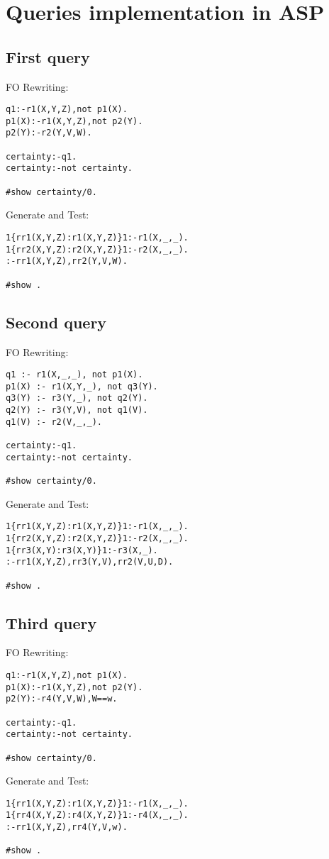 
\section{Queries implementation in ASP}

\subsection{First query}

FO Rewriting:
\begin{lstlisting}
q1:-r1(X,Y,Z),not p1(X).
p1(X):-r1(X,Y,Z),not p2(Y).
p2(Y):-r2(Y,V,W).

certainty:-q1.
certainty:-not certainty.

#show certainty/0.
\end{lstlisting}

Generate and Test:
\begin{lstlisting}
1{rr1(X,Y,Z):r1(X,Y,Z)}1:-r1(X,_,_).
1{rr2(X,Y,Z):r2(X,Y,Z)}1:-r2(X,_,_).
:-rr1(X,Y,Z),rr2(Y,V,W).

#show .
\end{lstlisting}


\subsection{Second query}


FO Rewriting:
\begin{lstlisting}
q1 :- r1(X,_,_), not p1(X).
p1(X) :- r1(X,Y,_), not q3(Y).
q3(Y) :- r3(Y,_), not q2(Y).
q2(Y) :- r3(Y,V), not q1(V).
q1(V) :- r2(V,_,_).

certainty:-q1.
certainty:-not certainty.

#show certainty/0.
\end{lstlisting}

Generate and Test:
\begin{lstlisting}
1{rr1(X,Y,Z):r1(X,Y,Z)}1:-r1(X,_,_).
1{rr2(X,Y,Z):r2(X,Y,Z)}1:-r2(X,_,_).
1{rr3(X,Y):r3(X,Y)}1:-r3(X,_).
:-rr1(X,Y,Z),rr3(Y,V),rr2(V,U,D).

#show .
\end{lstlisting}


\subsection{Third query}

FO Rewriting:
\begin{lstlisting}
q1:-r1(X,Y,Z),not p1(X).
p1(X):-r1(X,Y,Z),not p2(Y).
p2(Y):-r4(Y,V,W),W==w.

certainty:-q1.
certainty:-not certainty.

#show certainty/0.
\end{lstlisting}

Generate and Test:
\begin{lstlisting}
1{rr1(X,Y,Z):r1(X,Y,Z)}1:-r1(X,_,_).
1{rr4(X,Y,Z):r4(X,Y,Z)}1:-r4(X,_,_).
:-rr1(X,Y,Z),rr4(Y,V,w).

#show .
\end{lstlisting}
